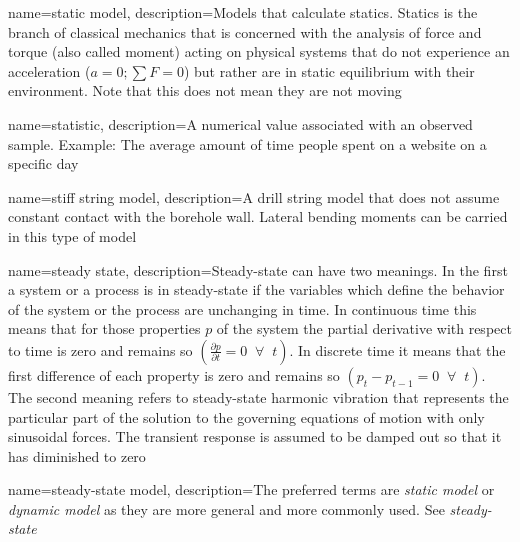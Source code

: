 \newcommand*{\staticforcebalance}{$a = 0; \sum F = 0$}
{
	name=static model,
	description=Models that calculate statics.  Statics is the branch of classical mechanics that is concerned with the analysis of force and torque (also called moment) acting on physical systems that do not experience an acceleration (\staticforcebalance)\comma{} but rather\comma{} are in static equilibrium with their environment.  Note that this does not mean they are not moving
}

{
	name=statistic,
	description={A numerical value associated with an observed sample.  Example: The average amount of time people spent on a website on a specific day}
}

{
	name=stiff string model,
	description={A drill string model that does not assume constant contact with the borehole wall.  Lateral bending moments can be carried in this type of model}
}

\newcommand*{\systemproperty}{$p$}
\newcommand*{\continuoussteadystate}{\ensuremath{\left( \frac{\partial p}{\partial t}=0 \;\;\forall\;\; t \right)}}
\newcommand*{\discretesteadystate}{\ensuremath{\left( p_t-p_{t-1}=0 \;\;\forall\;\; t \right)}}
{
	name=steady state,
	description=Steady-state can have two meanings. In the first\comma{} a system or a process is in steady-state if the variables which define the behavior of the system or the process are unchanging in time.  In continuous time\comma{} this means that for those properties \systemproperty{} of the system\comma{} the partial derivative with respect to time is zero and remains so \continuoussteadystate{}.  In discrete time\comma{} it means that the first difference of each property is zero and remains so \discretesteadystate{}.  The second meaning refers to steady-state harmonic vibration that represents the particular part of the solution to the governing equations of motion with only sinusoidal forces.  The transient response is assumed to be damped out so that it has diminished to zero
}

{
	name=steady-state model,
	description=The preferred terms are \textit{static model} or \textit{dynamic model} as they are more general and more commonly used.  See \emph{steady-state}
}


